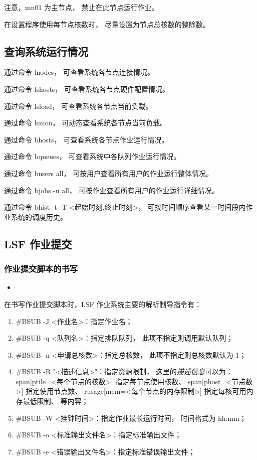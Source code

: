 \documentclass[UTF8]{ctexart}
\newcommand{\mynote}[1]{\colorbox{gray!35}{#1}}
\newcommand{\mynnote}[1]{\colorbox{gray!15}{\color{red}#1}}
\newcommand{\insertbash}[2]{\begin{itemize}\item[]\end{itemize}}
\begin{document}
注意，\mynote{mn01} 为主节点，
禁止在此节点运行作业。

在设置程序使用每节点核数时，
尽量设置为节点总核数的整除数。

\subsection{查询系统运行情况}
通过命令 \mynnote{lnodes}，
可查看系统各节点连接情况。

通过命令 \mynnote{lshosts}，
可查看系统各节点硬件配置情况。

通过命令 \mynnote{lsload}，
可查看系统各节点当前负载。

通过命令 \mynnote{lsmon}，
可动态查看系统各节点当前负载。

通过命令 \mynnote{bhosts}，
可查看系统各节点作业运行情况。

通过命令 \mynnote{bqueues}，
可查看系统中各队列作业运行情况。

通过命令 \mynnote{busers all}，
可按用户查看所有用户的作业运行整体情况。

通过命令 \mynnote{bjobs -u all}，
可按作业查看所有用户的作业运行详细情况。

通过命令 \mynnote{bhist -t -T <起始时刻,终止时刻>}，
可按时间顺序查看某一时间段内作业系统的调度历史。

\subsection{LSF 作业提交}
\subsubsection{作业提交脚本的书写}
\insertbash{material/lsf.sh}{LSF 作业提交脚本示例}

在书写作业提交脚本时，LSF 作业系统主要的解析制导指令有：
\begin{enumerate}[\hspace{15mm}（1）]
  \item \mynnote{\#BSUB -J <作业名>}：指定作业名；
  \item \mynnote{\#BSUB -q <队列名>}：指定排队队列，
    此项不指定则调用默认队列；
  \item \mynnote{\#BSUB -n <申请总核数>}：指定总核数，
    此项不指定则总核数默认为 1；
  \item \mynnote{\#BSUB -R "<描述信息>"}：指定资源限制，
    这里的{\em 描述信息}可以为：\newline
    \mynnote{span[ptile=<每个节点的核数>]} 指定每节点使用核数、\newline
    \mynnote{span[phost=<节点数>]} 指定使用节点数、\newline
    \mynnote{rusage[mem=<每个节点的内存限制>]} 指定每核可用内存最低限制、\newline
    等内容；
  \item \mynnote{\#BSUB -W <挂钟时间>}：指定作业最长运行时间，
    时间格式为 hh:mm；
  \item \mynnote{\#BSUB -o <标准输出文件名>}：指定标准输出文件；
  \item \mynnote{\#BSUB -e <错误输出文件名>}：指定标准错误输出文件；
\end{enumerate}
\end{document}
